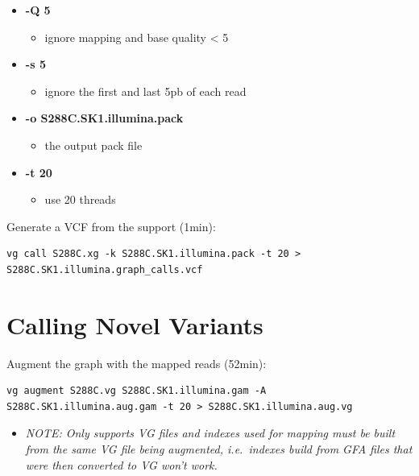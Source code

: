 \documentclass[
]{book}
\providecommand{\tightlist}{%
  \setlength{\itemsep}{0pt}\setlength{\parskip}{0pt}}
\begin{document}
\begin{itemize}
\tightlist
\item
  \textbf{-Q 5}

  \begin{itemize}
  \tightlist
  \item
    ignore mapping and base quality \textless{} 5
  \end{itemize}
\item
  \textbf{-s 5}

  \begin{itemize}
  \tightlist
  \item
    ignore the first and last 5pb of each read
  \end{itemize}
\item
  \textbf{-o S288C.SK1.illumina.pack}

  \begin{itemize}
  \tightlist
  \item
    the output pack file
  \end{itemize}
\item
  \textbf{-t 20}

  \begin{itemize}
  \tightlist
  \item
    use 20 threads
  \end{itemize}
\end{itemize}

Generate a VCF from the support (1min):

\begin{verbatim}
vg call S288C.xg -k S288C.SK1.illumina.pack -t 20 > S288C.SK1.illumina.graph_calls.vcf
\end{verbatim}

\hypertarget{calling-novel-variants}{%
\section{Calling Novel Variants}\label{calling-novel-variants}}

Augment the graph with the mapped reads (52min):

\begin{verbatim}
vg augment S288C.vg S288C.SK1.illumina.gam -A S288C.SK1.illumina.aug.gam -t 20 > S288C.SK1.illumina.aug.vg
\end{verbatim}

\begin{itemize}
\tightlist
\item
  \emph{NOTE: Only supports VG files and indexes used for mapping must be built from the same VG file being augmented, i.e.~indexes build from GFA files that were then converted to VG won't work.}
\end{itemize}
\end{document}
